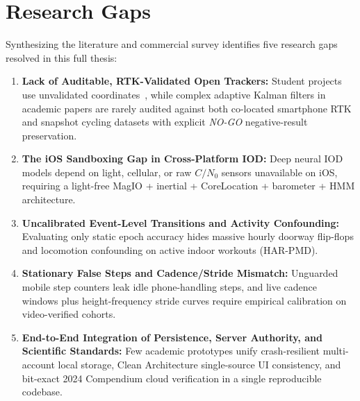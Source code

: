 \section{Research Gaps}
Synthesizing the literature and commercial survey identifies five research gaps resolved in this full thesis:
\begin{enumerate}
    \item \textbf{Lack of Auditable, RTK-Validated Open Trackers:} Student projects use unvalidated coordinates~\cite{aetron2026prethesis}, while complex adaptive Kalman filters in academic papers are rarely audited against both co-located smartphone RTK and snapshot cycling datasets with explicit \textit{NO-GO} negative-result preservation.
    \item \textbf{The iOS Sandboxing Gap in Cross-Platform IOD:} Deep neural IOD models depend on light, cellular, or raw $C/N_0$ sensors unavailable on iOS, requiring a light-free MagIO + inertial + CoreLocation + barometer + HMM architecture.
    \item \textbf{Uncalibrated Event-Level Transitions and Activity Confounding:} Evaluating only static epoch accuracy hides massive hourly doorway flip-flops and locomotion confounding on active indoor workouts (HAR-PMD).
    \item \textbf{Stationary False Steps and Cadence/Stride Mismatch:} Unguarded mobile step counters leak idle phone-handling steps, and live cadence windows plus height-frequency stride curves require empirical calibration on video-verified cohorts.
    \item \textbf{End-to-End Integration of Persistence, Server Authority, and Scientific Standards:} Few academic prototypes unify crash-resilient multi-account local storage, Clean Architecture single-source UI consistency, and bit-exact 2024 Compendium cloud verification in a single reproducible codebase.
\end{enumerate}
